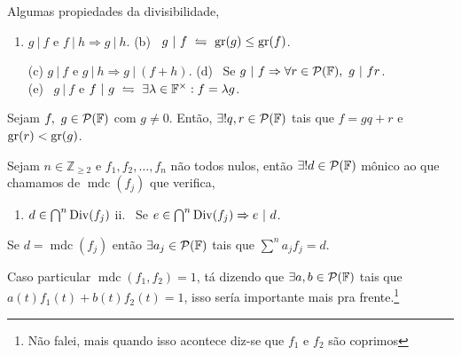 \begin{proposition}
    \label{prop:0.2}
    Algumas propiedades da divisibilidade, 
    \begin{enumerate}[left = 0.55cm, label = (\alph*)]
        \item \(g \ | \ f\) e \(f \ | \ h \Rightarrow g\ | \ h \).\hspace{3cm} (b) \ \(g \ | \ f \ \leftrightharpoons\  \operatorname{gr}(g) \leq \operatorname{gr}(f)\).   
        \item[(c)] \(g\ | \ f \) e \(g \ | \ h\Rightarrow g\ | \ (f+h)\). \hspace{1.5cm }  (d) \ Se \(g\ | \ f \Rightarrow  \forall r \in \mathcal{P}(\mathbb{F}), \   g \ | \ f r\).  \vspace{-0.4cm}\\ 
        \- \hspace{2.7cm}(e) \ \(g \ | \ f\) e \(f \ | \ g \ \leftrightharpoons \ \exists \lambda \in \mathbb{F}^{\times}: f = \lambda g\).  
    \end{enumerate}
\end{proposition}

\theoremnum{ \ \hspace{-0.5cm}}
\begin{theorem}
    Sejam \(f, \ g \in \mathcal{P}(\mathbb{F})\) com \(g\neq 0\). Então, \(\exists ! q, r \in \mathcal{P}(\mathbb{F}) \) tais que \(f = gq +r\) e \( \operatorname{gr}(r) < \operatorname{gr}(g)\). 
\end{theorem}

\newcommand{\mdc}{\operatorname{mdc}}
\theoremnum{\ \hspace{-0.3cm}}
\begin{theorem}
    Sejam \(n\in \mathbb{Z}_{\geq 2}\) e \(f_1, f_2, \ldots, f_n\) não todos nulos, então \(\exists ! d \in \mathcal{P}(\mathbb{F})\) mônico ao que chamamos de \(\mdc(f_j)\) que verifica, 
    \begin{enumerate}[label=\roman*.]
        \item \(d \in \bigcap^n \operatorname{Div}(f_j)\) \hspace{4cm} ii. \ Se \(e \in \bigcap^n \operatorname{Div}(f_j)  \Rightarrow e \ | \ d\). 
    \end{enumerate}
\end{theorem}

\begin{theorem}
    \label{thm:bezout}
    Se \(d = \mdc(f_j)\) então \(\exists a_j \in \mathcal{P}(\mathbb{F})\) tais que \(\sum^n a_j f_j = d\). 
\end{theorem}

\begin{note}
    Caso particular \(\mdc(f_1, f_2)=1\), tá dizendo que \(\exists a, b \in \mathcal{P}(\mathbb{F})\) tais que \(a(t)f_1(t) + b(t)f_2(t)= 1\), isso sería importante mais pra frente.\footnote{Não falei, mais quando isso acontece diz-se que \(f_1\) e \(f_2\) são coprimos}
\end{note}